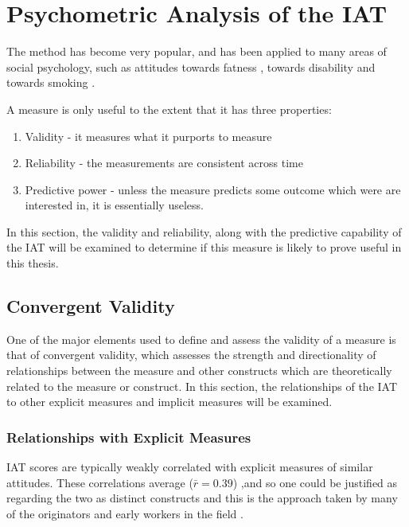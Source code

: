 \section{Psychometric Analysis of the IAT}
\label{sec:uses-psych-feat}

The method has become very popular, and has been applied to many areas of social psychology, such as attitudes towards fatness \cite{Ahern2008}, towards disability \cite{Pruett2006} and towards smoking \cite{Kahler2007}. 

A measure is only useful to the extent that it has three properties:
\begin{enumerate}
\item Validity - it measures what it purports to measure
\item Reliability - the measurements are consistent across time
\item Predictive power - unless the measure predicts some outcome which were are interested in, it is essentially useless.
\end{enumerate}

In this section, the validity and reliability, along with the predictive capability of the IAT will be examined to determine if this measure is likely to prove useful in this thesis. 

\subsection{Convergent Validity}
\label{sec:convergent-validity}

One of the major elements used to define and assess the validity of a measure is that of convergent validity, which assesses the strength and directionality of relationships between the measure and other constructs which are theoretically related to the measure or construct. In this section, the relationships of the IAT to other explicit measures and implicit measures will be examined. 


\subsubsection{Relationships with Explicit Measures}
\label{sec:relat-with-expl}



IAT scores are typically weakly correlated with explicit measures of similar attitudes. These correlations average ($\bar r=0.39$) \cite{Nosek2005},and so one could be justified as regarding the two as distinct constructs \cite{Nosek2007a} and this is the approach taken by many of the originators and early workers in the field \cite{Greenwald2000,Nosek2007a}. 

